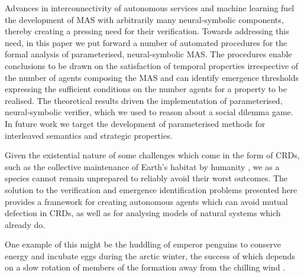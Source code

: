 Advances in interconnectivity of autonomous services and machine learning fuel
the development of MAS with arbitrarily many neural-symbolic components,
thereby creating a pressing need for their verification. Towards addressing
this need, in this paper we put forward a number of automated procedures for
the formal analysis of parameterised, neural-symbolic MAS. The procedures
enable conclusions to be drawn on the satisfaction of temporal properties
irrespective of the number of agents composing the MAS and can identify
emergence thresholds expressing the sufficient conditions on the number agents
for a property to be realised. The theoretical results driven the
implementation of parameterised, neural-symbolic verifier, which we used to
reason about a social dilemma game. In future work we target the development of
parameterised methods for interleaved semantics and strategic properties.


Given the existential nature of some challenges which come in the form of CRDs,
such as the collective maintenance of Earth's habitat by humanity
\cite{Smirnov19}, we as a species cannot remain unprepared to reliably avoid
their worst outcomes. The solution to the verification and
emergence identification problems presented here
provides a framework for creating autonomous agents which can avoid mutual
defection in CRDs, as well as for analysing models of natural systems which
already do.

One example of this might be the huddling of emperor penguins to conserve
energy and incubate eggs \cite{GilbertRLNA06} during the
arctic winter, the success of which depends on a slow rotation of members of
the formation away from the chilling wind \cite{WatersBK12}.
